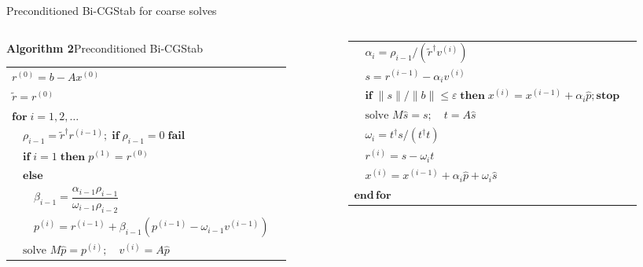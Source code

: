 \documentclass[UTF8,aspectratio=169,11pt,fontset=none]{ctexbeamer}
\begin{document}
\begin{frame}[t]{Preconditioned Bi-CGStab for coarse solves}
\begin{columns}[T,totalwidth=\textwidth]
\begin{column}{0.49\textwidth}
  \begin{center}
  \textbf{Algorithm 2}\quad Preconditioned Bi-CGStab
  \end{center}
  \fontsize{11}{13}\selectfont
  \begin{tabular}{@{}>{\raggedright\arraybackslash}p{0.96\linewidth}@{}}
  \toprule
  \(r^{(0)}=b-Ax^{(0)}\)\\
  \(\tilde r=r^{(0)}\)\\
  \(\mathbf{for}\;i=1,2,\ldots\)\\
  \(\quad\rho_{i-1}=\tilde r^\dagger r^{(i-1)};\;
    \mathbf{if}\;\rho_{i-1}=0\;\mathbf{fail}\)\\
  \(\quad\mathbf{if}\;i=1\;\mathbf{then}\;
    p^{(1)}=r^{(0)}\)\\
  \(\quad\mathbf{else}\)\\
  \(\quad\quad\beta_{i-1}=
    \dfrac{\alpha_{i-1}\rho_{i-1}}
    {\omega_{i-1}\rho_{i-2}}\)\\
  \(\quad\quad p^{(i)}=r^{(i-1)}
    +\beta_{i-1}(p^{(i-1)}-\omega_{i-1}v^{(i-1)})\)\\
  \(\quad\text{solve }M\hat p=p^{(i)};\quad v^{(i)}=A\hat p\)\\
  \bottomrule
  \end{tabular}
\end{column}
\begin{column}{0.49\textwidth}
  \vspace{0.62cm}
  \fontsize{10}{12}\selectfont
  \begin{tabular}{@{}>{\raggedright\arraybackslash}p{0.96\linewidth}@{}}
  \toprule
  \(\quad\alpha_i=\rho_{i-1}/
    (\tilde r^\dagger v^{(i)})\)\\
  \(\quad s=r^{(i-1)}-\alpha_i v^{(i)}\)\\
  \(\quad\mathbf{if}\;\|s\|/\|b\|\le\varepsilon\;\mathbf{then}\;
    x^{(i)}=x^{(i-1)}+\alpha_i\hat p;
    \mathbf{stop}\)\\
  \(\quad\text{solve }M\hat s=s;\quad t=A\hat s\)\\
  \(\quad\omega_i=t^\dagger s/(t^\dagger t)\)\\
  \(\quad r^{(i)}=s-\omega_i t\)\\
  \(\quad x^{(i)}=x^{(i-1)}
    +\alpha_i\hat p+\omega_i\hat s\)\\
  \(\mathbf{end\,for}\)\\
  \bottomrule
  \end{tabular}
\end{column}
\end{columns}
\end{frame}
\end{document}
